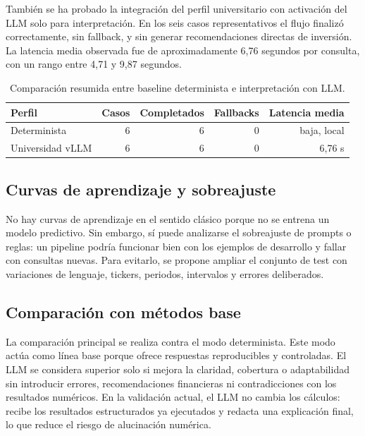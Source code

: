 \documentclass[11pt,a4paper]{article}
\begin{document}
Tambi\'en se ha probado la integraci\'on del perfil universitario con activaci\'on del LLM solo para interpretaci\'on. En los seis casos representativos el flujo finaliz\'o correctamente, sin fallback, y sin generar recomendaciones directas de inversi\'on. La latencia media observada fue de aproximadamente 6,76 segundos por consulta, con un rango entre 4,71 y 9,87 segundos.

\begin{table}[h]
\centering
\begin{tabular}{lrrrr}
\toprule
\textbf{Perfil} & \textbf{Casos} & \textbf{Completados} & \textbf{Fallbacks} & \textbf{Latencia media} \\
\midrule
Determinista & 6 & 6 & 0 & baja, local \\
Universidad vLLM & 6 & 6 & 0 & 6,76 s \\
\bottomrule
\end{tabular}
\caption{Comparaci\'on resumida entre baseline determinista e interpretaci\'on con LLM.}
\end{table}

\subsection{Curvas de aprendizaje y sobreajuste}

No hay curvas de aprendizaje en el sentido cl\'asico porque no se entrena un modelo predictivo. Sin embargo, s\'i puede analizarse el sobreajuste de prompts o reglas: un pipeline podr\'ia funcionar bien con los ejemplos de desarrollo y fallar con consultas nuevas. Para evitarlo, se propone ampliar el conjunto de test con variaciones de lenguaje, tickers, periodos, intervalos y errores deliberados.

\subsection{Comparaci\'on con m\'etodos base}

La comparaci\'on principal se realiza contra el modo determinista. Este modo act\'ua como l\'inea base porque ofrece respuestas reproducibles y controladas. El LLM se considera superior solo si mejora la claridad, cobertura o adaptabilidad sin introducir errores, recomendaciones financieras ni contradicciones con los resultados num\'ericos. En la validaci\'on actual, el LLM no cambia los c\'alculos: recibe los resultados estructurados ya ejecutados y redacta una explicaci\'on final, lo que reduce el riesgo de alucinaci\'on num\'erica.
\end{document}
